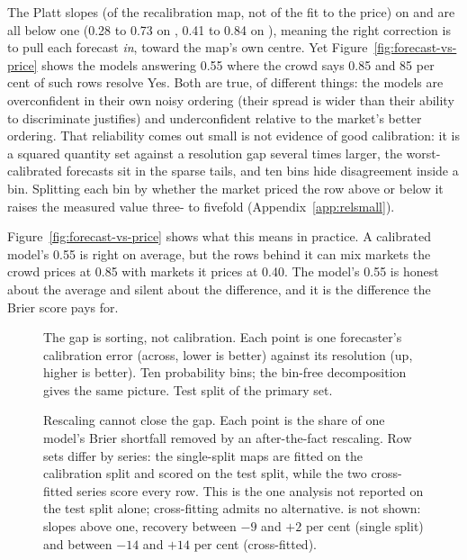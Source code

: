 The Platt slopes (of the recalibration map, not of the fit to the price) on
\winB and \winC are all below one (0.28 to 0.73 on \winB,
0.41 to 0.84 on \winC), meaning the right correction is to pull each forecast
\emph{in}, toward the map's own centre. Yet Figure~\ref{fig:forecast-vs-price} shows the
models answering 0.55 where the crowd says 0.85 and 85 per cent of such rows
resolve Yes. Both are true, of different things: the models are overconfident in
their own noisy ordering (their spread is wider than their ability to
discriminate justifies) and underconfident relative to the market's better
ordering. That reliability comes out small is not evidence of good calibration:
it is a squared quantity set against a resolution gap several times larger, the
worst-calibrated forecasts sit in the sparse tails, and ten bins hide
disagreement inside a bin. Splitting each bin by whether the market priced the
row above or below it raises the measured value three- to fivefold
(Appendix~\ref{app:relsmall}).

Figure~\ref{fig:forecast-vs-price} shows what this means in practice. A
calibrated model's 0.55 is right on average, but the rows behind it can mix
markets the crowd prices at 0.85 with markets it prices at 0.40. The model's 0.55
is honest about the average and silent about the difference, and it is the
difference the Brier score pays for.

\begin{figure}[!tbp]
\centering

\caption{The gap is sorting, not calibration. Each point is one forecaster's calibration error
(across, lower is better) against its resolution (up, higher is better). Ten probability bins;
the bin-free decomposition gives the same picture. Test split of the primary set.}
\label{fig:sorting}
\end{figure}

\begin{figure}[!tbp]
\centering

\caption{Rescaling cannot close the gap. Each point is the share of one model's Brier
shortfall removed by an after-the-fact rescaling. Row sets differ by series: the single-split
maps are fitted on the calibration split and scored on the test split, while the two
cross-fitted series score every row. This is the one analysis not reported on the test split
alone; cross-fitting admits no alternative. \winA is not shown: slopes above one, recovery between $-9$ and $+2$ per cent
(single split) and between $-14$ and $+14$ per cent (cross-fitted).}
\label{fig:recalibration}
\end{figure}

